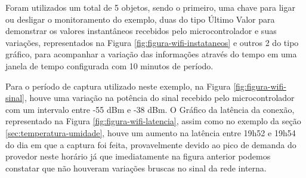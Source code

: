 Foram utilizados um total de 5 objetos, sendo o primeiro, uma chave para ligar ou desligar o monitoramento do exemplo, duas do tipo Último Valor para demonstrar os valores instantâneos recebidos pelo microcontrolador e suas variações, representados na Figura \ref{fig:figura-wifi-instataneos} e outros 2 do tipo gráfico, para acompanhar a variação das informações através do tempo em uma janela de tempo configurada com 10 minutos de período. 

        \begin{figure}[!h]
    	\end{figure}
    	
Para o período de captura utilizado neste exemplo, na Figura \ref{fig:figura-wifi-sinal}, houve uma variação na potência do sinal recebido pelo microcontrolador com um intervalo entre -55 dBm e -38 dBm. O Gráfico da latência da conexão, representado na Figura \ref{fig:figura-wifi-latencia}, assim como no exemplo da seção \ref{sec:temperatura-umidade}, houve um aumento na latência entre 19h52 e 19h54 do dia em que a captura foi feita, provavelmente devido ao pico de demanda do provedor neste horário já que imediatamente na figura anterior podemos constatar que não houveram variações bruscas no sinal da rede interna.
    	
        \begin{figure}[!h]
    	\end{figure}
    	
